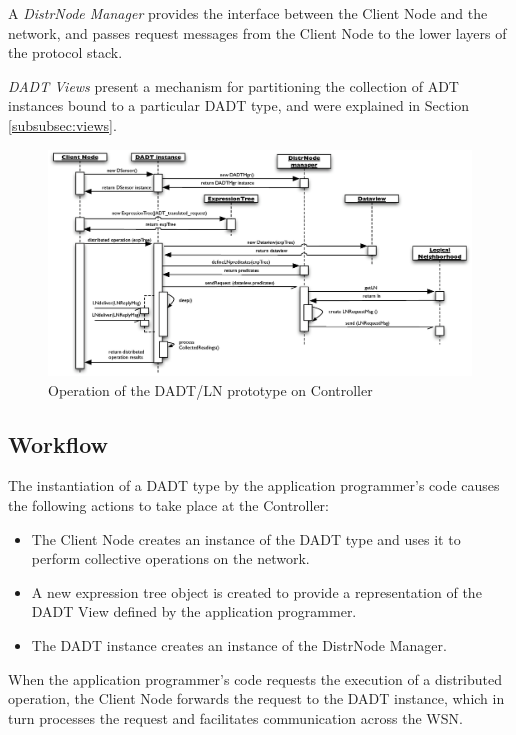 A \emph{DistrNode Manager} provides the interface between the Client Node and
the network, and passes request messages from the Client Node to the lower layers
of the protocol stack.

\emph{DADT Views} present a mechanism for partitioning the collection of
ADT instances bound to a particular DADT type, and were explained in Section
\ref{subsubsec:views}.

\begin{figure}
\centering
\includegraphics[width=\textwidth]{img/SeqDiagram_PCnode.eps}
\caption[Operation of the DADT/LN prototype on Controller]{Operation of the DADT/LN prototype on Controller}
\label{Fig:SeqDiagram_PCnode}
\end{figure}

\subsection{Workflow}

The instantiation of a DADT type by the application programmer's
code causes the following actions to take place at the Controller:
\begin{itemize}
 \item The Client Node creates an instance of the DADT type and uses it 
 to perform collective operations on the network.
  \item A new expression tree object 
  is created to provide a representation of the DADT View defined by the application
  programmer.
  \item The DADT instance creates an instance of the DistrNode Manager.
\end{itemize}

When the application programmer's code requests the execution of a distributed operation, the Client Node forwards the request to the DADT instance, which in turn
processes the request and facilitates communication across the WSN.

